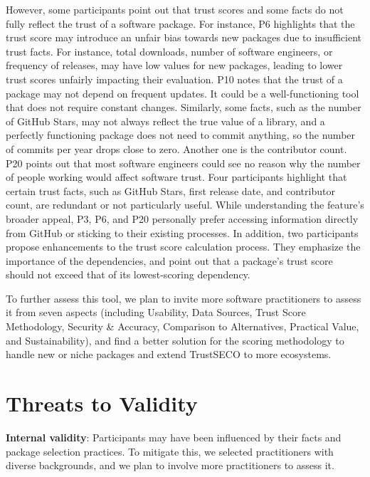 \documentclass[10pt,conference]{IEEEtran}
\begin{document}
However, some participants point out that trust scores and some facts do not fully reflect the trust of a software package. For instance, P6 highlights that the trust score may introduce an unfair bias towards new packages due to insufficient trust facts. For instance, total downloads, number of software engineers, or frequency of releases, may have low values for new packages, leading to lower trust scores unfairly impacting their evaluation. P10 notes that the trust of a package may not depend on frequent updates. It could be a well-functioning tool that does not require constant changes. Similarly, some facts, such as the number of GitHub Stars, may not always reflect the true value of a library, and a perfectly functioning package does not need to commit anything, so the number of commits per year drops close to zero. Another one is the contributor count. P20 points out that most software engineers could see no reason why the number of people working would affect software trust. Four participants highlight that certain trust facts, such as GitHub Stars, first release date, and contributor count, are redundant or not particularly useful. While understanding the feature's broader appeal, P3, P6, and P20 personally prefer accessing information directly from GitHub or sticking to their existing processes. In addition, two participants propose enhancements to the trust score calculation process. They emphasize the importance of the dependencies, and point out that a package's trust score should not exceed that of its lowest-scoring dependency.

To further assess this tool, we plan to invite more software practitioners to assess it from seven aspects (including Usability, Data Sources, Trust Score Methodology, Security \& Accuracy, Comparison to Alternatives, Practical Value, and Sustainability), and find a better solution for the scoring methodology to handle new or niche packages and extend TrustSECO to more ecosystems.

\section{Threats to Validity}
\label{sec5:threat}

\noindent\textbf{Internal validity}: Participants may have been influenced by their facts and package selection practices. To mitigate this, we selected practitioners with diverse backgrounds, and we plan to involve more practitioners to assess it.
\end{document}
